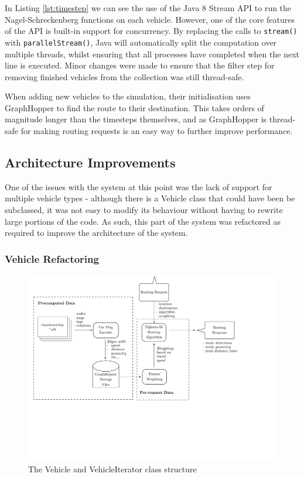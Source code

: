 \documentclass[ %
                    author={Alexander Hill},
                supervisor={Dr. Benjamin Sach},
                    degree={MEng},
                     title={MARMOSET},
                  subtitle={Multi-Agent Route Management using Online Simulation for Efficient Transportation},
                      type={research},
                      year={2016} ]{dissertation}
\begin{document}
In Listing \ref{lst:timestep} we can see the use of the Java 8 Stream API to run
the Nagel-Schreckenberg functions on each vehicle. However, one of the core
features of the API is built-in support for concurrency. By replacing the calls
to \texttt{stream()} with \texttt{parallelStream()}, Java will automatically
split the computation over multiple threads, whilst ensuring that all processes
have completed when the next line is executed. Minor changes were made to ensure
that the filter step for removing finished vehicles from the collection was
still thread-safe.

When adding new vehicles to the simulation, their initialisation uses
GraphHopper to find the route to their destination. This takes orders of
magnitude longer than the timesteps themselves, and as GraphHopper is
thread-safe for making routing requests is an easy way to further improve
performance.

\subsection{Architecture Improvements}

One of the issues with the system at this point was the lack of support for
multiple vehicle types - although there is a Vehicle class that could have been
be subclassed, it was not easy to modify its behaviour without having to rewrite
large portions of the code.  As such, this part of the system was refactored as
required to improve the architecture of the system.

\subsubsection{Vehicle Refactoring}

\begin{figure}[h]
    \centering
    \includegraphics[scale=0.6,page=6,clip,trim=0 11cm 8cm 0]{architecture}
    \caption{The Vehicle and VehicleIterator class structure}\label{fig:veh-arch}
\end{figure}
\end{document}
